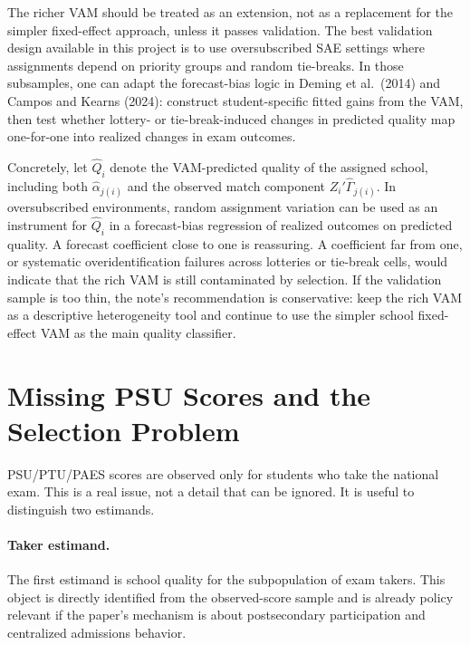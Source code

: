 \documentclass[11pt]{article}
\begin{document}
The richer VAM should be treated as an extension, not as a replacement for the simpler fixed-effect approach, unless it passes validation. The best validation design available in this project is to use oversubscribed SAE settings where assignments depend on priority groups and random tie-breaks. In those subsamples, one can adapt the forecast-bias logic in Deming et al.\ (2014) and Campos and Kearns (2024): construct student-specific fitted gains from the VAM, then test whether lottery- or tie-break-induced changes in predicted quality map one-for-one into realized changes in exam outcomes.

Concretely, let $\widehat{Q}_i$ denote the VAM-predicted quality of the assigned school, including both $\hat{\alpha}_{j(i)}$ and the observed match component $Z_i'\hat{\Gamma}_{j(i)}$. In oversubscribed environments, random assignment variation can be used as an instrument for $\widehat{Q}_i$ in a forecast-bias regression of realized outcomes on predicted quality. A forecast coefficient close to one is reassuring. A coefficient far from one, or systematic overidentification failures across lotteries or tie-break cells, would indicate that the rich VAM is still contaminated by selection. If the validation sample is too thin, the note's recommendation is conservative: keep the rich VAM as a descriptive heterogeneity tool and continue to use the simpler school fixed-effect VAM as the main quality classifier.

\section*{Missing PSU Scores and the Selection Problem}

PSU/PTU/PAES scores are observed only for students who take the national exam. This is a real issue, not a detail that can be ignored. It is useful to distinguish two estimands.

\paragraph{Taker estimand.}
The first estimand is school quality for the subpopulation of exam takers. This object is directly identified from the observed-score sample and is already policy relevant if the paper's mechanism is about postsecondary participation and centralized admissions behavior.
\end{document}
